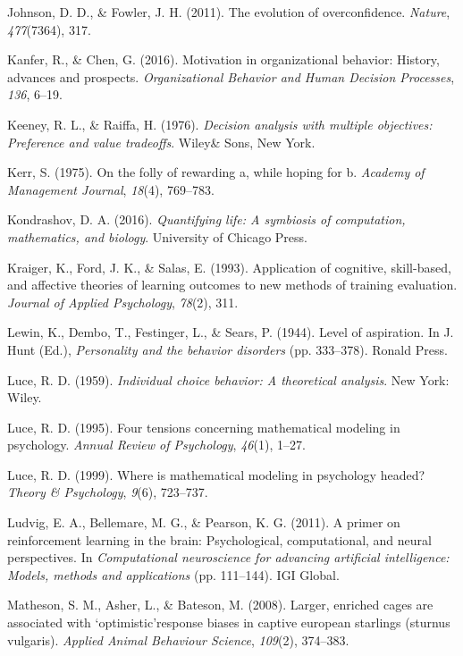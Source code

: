 \documentclass[english,man]{apa6}
\theoremstyle{definition}
\theoremstyle{definition}
\theoremstyle{definition}
\theoremstyle{remark}
\begin{document}
\hypertarget{ref-johnson2011}{}
Johnson, D. D., \& Fowler, J. H. (2011). The evolution of
overconfidence. \emph{Nature}, \emph{477}(7364), 317.

\hypertarget{ref-kanfer2016}{}
Kanfer, R., \& Chen, G. (2016). Motivation in organizational behavior:
History, advances and prospects. \emph{Organizational Behavior and Human
Decision Processes}, \emph{136}, 6--19.

\hypertarget{ref-keeney1976}{}
Keeney, R. L., \& Raiffa, H. (1976). \emph{Decision analysis with
multiple objectives: Preference and value tradeoffs}. Wiley\& Sons, New
York.

\hypertarget{ref-kerr1975}{}
Kerr, S. (1975). On the folly of rewarding a, while hoping for b.
\emph{Academy of Management Journal}, \emph{18}(4), 769--783.

\hypertarget{ref-kondrashov2016}{}
Kondrashov, D. A. (2016). \emph{Quantifying life: A symbiosis of
computation, mathematics, and biology}. University of Chicago Press.

\hypertarget{ref-kraiger1993}{}
Kraiger, K., Ford, J. K., \& Salas, E. (1993). Application of cognitive,
skill-based, and affective theories of learning outcomes to new methods
of training evaluation. \emph{Journal of Applied Psychology},
\emph{78}(2), 311.

\hypertarget{ref-lewin1944}{}
Lewin, K., Dembo, T., Festinger, L., \& Sears, P. (1944). Level of
aspiration. In J. Hunt (Ed.), \emph{Personality and the behavior
disorders} (pp. 333--378). Ronald Press.

\hypertarget{ref-luce1959}{}
Luce, R. D. (1959). \emph{Individual choice behavior: A theoretical
analysis}. New York: Wiley.

\hypertarget{ref-luce1995}{}
Luce, R. D. (1995). Four tensions concerning mathematical modeling in
psychology. \emph{Annual Review of Psychology}, \emph{46}(1), 1--27.

\hypertarget{ref-luce1999}{}
Luce, R. D. (1999). Where is mathematical modeling in psychology headed?
\emph{Theory \& Psychology}, \emph{9}(6), 723--737.

\hypertarget{ref-ludvig2011}{}
Ludvig, E. A., Bellemare, M. G., \& Pearson, K. G. (2011). A primer on
reinforcement learning in the brain: Psychological, computational, and
neural perspectives. In \emph{Computational neuroscience for advancing
artificial intelligence: Models, methods and applications} (pp.
111--144). IGI Global.

\hypertarget{ref-matheson2008}{}
Matheson, S. M., Asher, L., \& Bateson, M. (2008). Larger, enriched
cages are associated with `optimistic'response biases in captive
european starlings (sturnus vulgaris). \emph{Applied Animal Behaviour
Science}, \emph{109}(2), 374--383.
\end{document}

